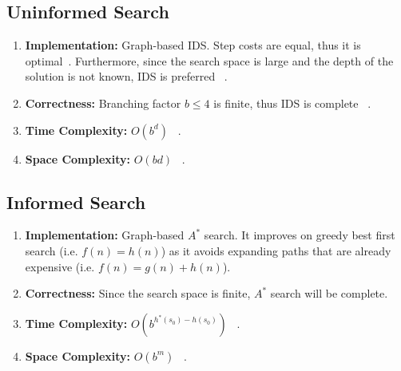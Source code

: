 \documentclass[runningheads]{llncs}
\begin{document}
\subsection{Uninformed Search}
\begin{enumerate}
    \item \textbf{Implementation:} Graph-based IDS. Step costs are equal, thus it is optimal~\cite[p88]{stuart_russell_artifical_2010}. Furthermore, since the search space is large and the depth of the solution is not known, IDS is preferred ~\cite[p90]{stuart_russell_artifical_2010}.
    \item \textbf{Correctness:} Branching factor \( b \leq 4 \) is finite, thus IDS is complete ~\cite[p88-90]{stuart_russell_artifical_2010}. 
    \item \textbf{Time Complexity:} \( O(b^d) \) ~\cite[p88-90]{stuart_russell_artifical_2010}.
    \item \textbf{Space Complexity:} \( O(bd) \) ~\cite[p88-90]{stuart_russell_artifical_2010}.
\end{enumerate}

\subsection{Informed Search}
\begin{enumerate}
    \item \textbf{Implementation:} Graph-based \( A^* \) search. It improves on greedy best first search (i.e. \( f(n) = h(n) \)) as it avoids expanding paths that are already expensive (i.e. \( f(n) = g(n) + h(n) \)).
    \item \textbf{Correctness:} Since the search space is finite, \( A^* \) search will be complete.
    \item \textbf{Time Complexity:} \( O(b^{h^*(s_0) - h(s_0)}) \) ~\cite[p93-99]{stuart_russell_artifical_2010}.
    \item \textbf{Space Complexity:} \( O(b^m) \) ~\cite[p93-99]{stuart_russell_artifical_2010}.
\end{enumerate}
\end{document}
